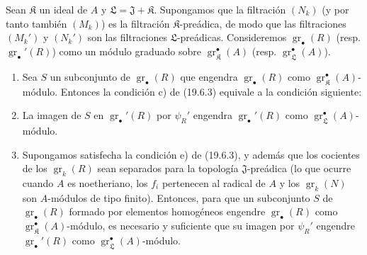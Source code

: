 \begin{corollary}[19.6.4]
\label{IV.19.6.4}
Sean $\mathfrak K$ un ideal de $A$ y $\mathfrak L=\mathfrak J+\mathfrak K$. Supongamos que la filtración $(N_k)$ (y por tanto también $(M_k)$) es la filtración $\mathfrak K$-preádica, de modo que las filtraciones $(M_k')$ y $(N_k')$ son las filtraciones $\mathfrak L$-preádicas. Consideremos $\operatorname{gr}_\bullet(R)$ \textup{(resp. $\operatorname{gr}_\bullet'(R)$)} como un módulo graduado sobre $\operatorname{gr}_{\mathfrak K}^\bullet(A)$ \textup{(resp. $\operatorname{gr}_{\mathfrak L}^\bullet(A)$)}.
\begin{enumerate}
  \item[\textup{(i)}] Sea $S$ un subconjunto de $\operatorname{gr}_\bullet(R)$ que engendra $\operatorname{gr}_\bullet(R)$ como $\operatorname{gr}_{\mathfrak K}^\bullet(A)$-módulo. Entonces la condición \textup{c)} de \textup{(19.6.3)} equivale a la condición siguiente:
  \item[\textup{c$'$)}] La imagen de $S$ en $\operatorname{gr}_\bullet'(R)$ por $\psi_R'$ engendra $\operatorname{gr}_\bullet'(R)$ como $\operatorname{gr}_{\mathfrak L}^\bullet(A)$-módulo.
  \item[\textup{(ii)}] Supongamos satisfecha la condición \textup{e)} de \textup{(19.6.3)}, y además que los cocientes de los $\operatorname{gr}_k(R)$ sean separados para la topología $\mathfrak J$-preádica \textup{(lo que ocurre cuando $A$ es noetheriano, los $f_i$ pertenecen al radical de $A$ y los $\operatorname{gr}_k(N)$ son $A$-módulos de tipo finito)}. Entonces, para que un subconjunto $S$ de $\operatorname{gr}_\bullet(R)$ formado por elementos homogéneos engendre $\operatorname{gr}_\bullet(R)$ como $\operatorname{gr}_{\mathfrak K}^\bullet(A)$-módulo, es necesario y suficiente que su imagen por $\psi_R'$ engendre $\operatorname{gr}_\bullet'(R)$ como $\operatorname{gr}_{\mathfrak L}^\bullet(A)$-módulo.
\end{enumerate}
\end{corollary}


